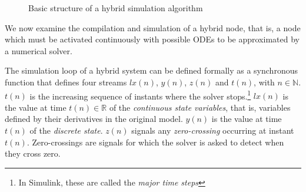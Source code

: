 \documentclass[11pt,titlepage,twoside]{report}
\newcommand{\lx}{\ensuremath{\mathit{lx}}}
\newcommand{\simulink}{{\sf Simulink}}
\newcommand{\bR}{\mathbb{R}}
\newcommand{\bN}{\mathbb{N}}
\begin{document}
\begin{figure}[t]
\centering%
\caption{Basic structure of a hybrid simulation 
algorithm\label{fig:simalgo}}
\end{figure}

We now examine the compilation and simulation of a hybrid node,
that is, a node which must be activated continuously with
possible ODEs to be approximated by a numerical solver.

The simulation loop of a hybrid system can be defined formally as a
synchronous function that defines four streams $\lx(n)$,
$y(n)$, $z(n)$ and $t(n)$, with $n \in \bN$.  $t(n)$ is the increasing
sequence of instants where the solver stops.\footnote{In \simulink,
  these are called the \emph{major time steps}} $\lx(n)$ is the value
at time $t(n) \in \bR$ of the \emph{continuous state variables}, that
is, variables defined by their derivatives in the original
model. $y(n)$ is the value at time $t(n)$ of the \emph{discrete
  state}.  $z(n)$ signals any \emph{zero-crossing} occurring at
instant $t(n)$. Zero-crossings are signals for which the solver is
asked to detect when they cross zero.
\end{document}
